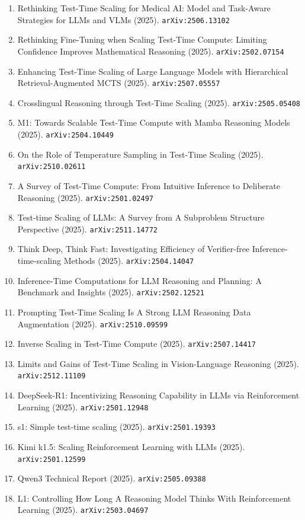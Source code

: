 \documentclass[11pt]{article}
\begin{document}
\begin{enumerate}
  \item Rethinking Test-Time Scaling for Medical AI: Model and Task-Aware Strategies for LLMs and VLMs (2025). \texttt{arXiv:2506.13102}
  \item Rethinking Fine-Tuning when Scaling Test-Time Compute: Limiting Confidence Improves Mathematical Reasoning (2025). \texttt{arXiv:2502.07154}
  \item Enhancing Test-Time Scaling of Large Language Models with Hierarchical Retrieval-Augmented MCTS (2025). \texttt{arXiv:2507.05557}
  \item Crosslingual Reasoning through Test-Time Scaling (2025). \texttt{arXiv:2505.05408}
  \item M1: Towards Scalable Test-Time Compute with Mamba Reasoning Models (2025). \texttt{arXiv:2504.10449}
  \item On the Role of Temperature Sampling in Test-Time Scaling (2025). \texttt{arXiv:2510.02611}
  \item A Survey of Test-Time Compute: From Intuitive Inference to Deliberate Reasoning (2025). \texttt{arXiv:2501.02497}
  \item Test-time Scaling of LLMs: A Survey from A Subproblem Structure Perspective (2025). \texttt{arXiv:2511.14772}
  \item Think Deep, Think Fast: Investigating Efficiency of Verifier-free
  Inference-time-scaling Methods (2025). \texttt{arXiv:2504.14047}
  \item Inference-Time Computations for LLM Reasoning and Planning: A Benchmark
  and Insights (2025). \texttt{arXiv:2502.12521}
  \item Prompting Test-Time Scaling Is A Strong LLM Reasoning Data Augmentation (2025). \texttt{arXiv:2510.09599}
  \item Inverse Scaling in Test-Time Compute (2025). \texttt{arXiv:2507.14417}
  \item Limits and Gains of Test-Time Scaling in Vision-Language Reasoning (2025). \texttt{arXiv:2512.11109}
  \item DeepSeek-R1: Incentivizing Reasoning Capability in LLMs via Reinforcement Learning (2025). \texttt{arXiv:2501.12948}
  \item s1: Simple test-time scaling (2025). \texttt{arXiv:2501.19393}
  \item Kimi k1.5: Scaling Reinforcement Learning with LLMs (2025). \texttt{arXiv:2501.12599}
  \item Qwen3 Technical Report (2025). \texttt{arXiv:2505.09388}
  \item L1: Controlling How Long A Reasoning Model Thinks With Reinforcement Learning (2025). \texttt{arXiv:2503.04697}

\end{enumerate}
\end{document}

